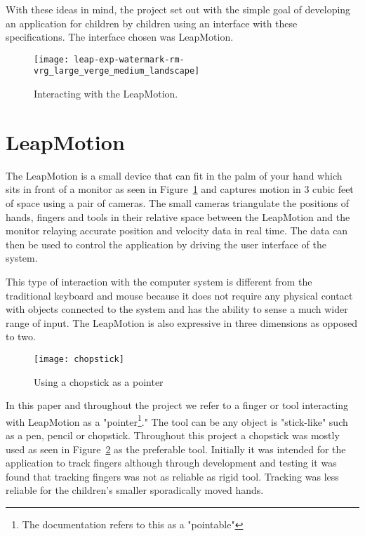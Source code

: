 With these ideas in mind, the project set out with the simple goal of developing an application for children by children using an interface with these specifications. The interface chosen was LeapMotion.


\begin{figure}
\centering
\texttt{[image: leap-exp-watermark-rm-vrg\_large\_verge\_medium\_landscape]}
\caption{Interacting with the LeapMotion. \cite{theverge} }
\label{fig:leapmotionpicture}
\end{figure}

\section{LeapMotion}

The LeapMotion is a small device that can fit in the palm of your hand which sits in front of a monitor as seen in Figure~\ref{fig:leapmotionpicture} and captures motion in 3 cubic feet of space using a pair of cameras. The small cameras triangulate the positions of hands, fingers and tools in their relative space between the LeapMotion and the monitor relaying accurate position and velocity data in real time. The data can then be used to control the application by driving the user interface of the system. \cite{leapmotion} 

This type of interaction with the computer system is different from the traditional keyboard and mouse because it does not require any physical contact with objects connected to the system and has the ability to sense a much wider range of input. The LeapMotion is also expressive in three dimensions as opposed to two.

\begin{figure}
\centering
\texttt{[image: chopstick]}
\caption{Using a chopstick as a pointer}
\label{fig:chopstick}
\end{figure}
In this paper and throughout the project we refer to a finger or tool interacting with LeapMotion as a "pointer\footnote{The documentation refers to this as a "pointable"}." The tool can be any object is "stick-like" such as a pen, pencil or chopstick. Throughout this project a chopstick was mostly used as seen in Figure~\ref{fig:chopstick} as the preferable tool. Initially it was intended for the application to track fingers although through development and testing it was found that tracking fingers was not as reliable as rigid tool. Tracking was less reliable for the children's smaller sporadically moved hands.

